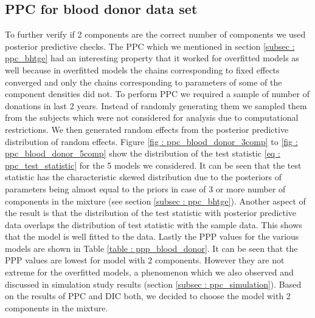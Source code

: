 \subsection{PPC for blood donor data set}
To further verify if 2 components are the correct number of components we used posterior predictive checks. The PPC which we mentioned in section \ref{subsec : ppc_bhtge} had an interesting property that it worked for overfitted models as well because in overfitted models the chains corresponding to fixed effects converged and only the chains corresponding to parameters of some of the component densities did not. To perform PPC we required a sample of number of donations in last 2 years. Instead of randomly generating them we sampled them from the subjects which were not considered for analysis due to computational restrictions. We then generated random effects from the posterior predictive distribution of random effects. Figure \ref{fig : ppc_blood_donor_3comp} to \ref{fig : ppc_blood_donor_5comp} show the distribution of the test statistic \ref{eq : ppc_test_statistic} for the 5 models we considered. It can be seen that the test statistic has the characteristic skewed distribution due to the posteriors of parameters being almost equal to the priors in case of 3 or more number of components in the mixture (see section \ref{subsec : ppc_bhtge}). Another aspect of the result is that the distribution of the test statistic with posterior predictive data overlaps the distribution of test statistic with the sample data. This shows that the model is well fitted to the data. Lastly the PPP values for the various models are shown in Table \ref{table : ppp_blood_donor}. It can be seen that the PPP values are lowest for model with 2 components. However they are not extreme for the overfitted models, a phenomenon which we also observed and discussed in simulation study results (section \ref{subsec : ppc_simulation}). Based on the results of PPC and DIC both, we decided to choose the model with 2 components in the mixture.

